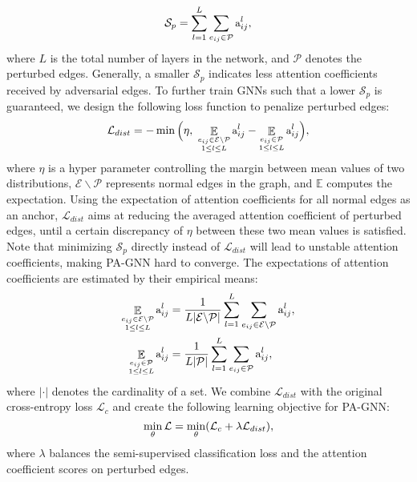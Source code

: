 \documentclass[sigconf]{acmart}
\newcommand{\ours}{{PA-GNN}\xspace}
\def \E {\mathcal{E}}
\def \P {\mathcal{P}}
\def \L {\mathcal{L}}
\begin{document}
\begin{equation} \label{eqn:attn_penalty} \small
    \mathcal{S}_p= \sum_{l=1}^{L} \sum_{e_{ij}\in\P} \text{a}_{ij}^l,
\end{equation}
where $L$ is the total number of layers in the network, and $\P$ denotes the perturbed edges. Generally, a smaller $\mathcal{S}_p$ indicates less attention coefficients received by adversarial edges. To further train GNNs such that a lower $\mathcal{S}_p$ is guaranteed, we design the following loss function to penalize perturbed edges:
\begin{equation} \label{eqn:attn_dist} \small
    \L_{dist} = - \min \Big ( \eta, \  \mathop{\mathbb{E}}_{\substack{e_{ij} \in \E \backslash \P \\ 1 \leq l \leq L}} \text{a}_{ij}^l - \mathop{\mathbb{E}}_{\substack{e_{ij} \in \P \\  1 \leq l \leq L}} \text{a}_{ij}^l \Big ),
\end{equation}
where $\eta$ is a hyper parameter controlling the margin between mean values of two distributions, $\E \backslash \P$ represents normal edges in the graph, and $\mathbb{E}$ computes the expectation. Using the expectation of attention coefficients for all normal edges as an anchor, $\L_{dist}$ aims at reducing the averaged attention coefficient of perturbed edges, until a certain discrepancy of $\eta$ between these two mean values is satisfied. 
Note that minimizing $\mathcal{S}_p$ directly instead of $\L_{dist}$ will lead to unstable attention coefficients, making \ours hard to converge. 
The expectations of attention coefficients are estimated by their empirical means:
\begin{align}
    \small \mathop{\mathbb{E}}_{\substack{e_{ij} \in \E \backslash \P \\ 1 \leq l \leq L}} \text{a}_{ij}^l & = \frac{1}{L|\E \backslash \P|} \sum_{l=1}^L  \sum_{e_{ij} \in \E \backslash \P} \text{a}_{ij}^l, \\
    \small \mathop{\mathbb{E}}_{\substack{e_{ij} \in \P \\  1 \leq l \leq L}} \text{a}_{ij}^l &  = \frac{1}{L|\P|} \sum_{l=1}^L \sum_{e_{ij} \in \P} \text{a}_{ij}^l,
\end{align}
where $|\cdot|$ denotes the cardinality of a set.
We combine $\L_{dist}$ with the original cross-entropy loss $\L_c$ and create the following learning objective for \ours:
\begin{equation} \label{eqn:objective} \small
   \min_{\theta} \L = \min_{\theta}(\L_c + \lambda \L_{dist}),
\end{equation}
where $\lambda$ balances the semi-supervised classification loss and the attention coefficient scores on perturbed edges.
\end{document}
